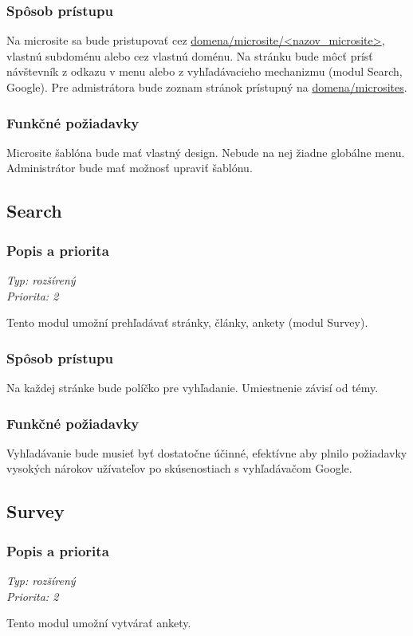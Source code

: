 \documentclass[a4paper,titlepage,11pt]{article}
\begin{document}
\subsubsection{Spôsob prístupu}
Na microsite sa bude pristupovať cez \url{domena/microsite/<nazov_microsite>}, vlastnú subdoménu alebo cez vlastnú doménu.
Na stránku bude môcť prísť návštevník z odkazu v menu alebo z vyhľadávacieho mechanizmu (modul Search, Google). 
Pre admistrátora bude zoznam stránok prístupný na \url{domena/microsites}.
\subsubsection{Funkčné požiadavky}
Microsite šablóna bude mať vlastný design. Nebude na nej žiadne globálne menu. Administrátor bude mať možnosť upraviť šablónu.

\subsection{Search}
\subsubsection{Popis a priorita}
\begin{flushleft}
 \emph{Typ: rozšírený}\\
 \emph{Priorita: 2}\\
\end{flushleft}
Tento modul umožní prehľadávať stránky, články, ankety (modul Survey).
\subsubsection{Spôsob prístupu}
Na každej stránke bude políčko pre vyhľadanie. Umiestnenie závisí od témy.
\subsubsection{Funkčné požiadavky}
Vyhľadávanie bude musieť byť dostatočne účinné, efektívne aby plnilo požiadavky vysokých nárokov užívateľov po skúsenostiach s vyhľadávačom Google.

\subsection{Survey}
\subsubsection{Popis a priorita}
\begin{flushleft}
 \emph{Typ: rozšírený}\\
 \emph{Priorita: 2}\\
\end{flushleft}
Tento modul umožní vytvárať ankety.
\end{document}
